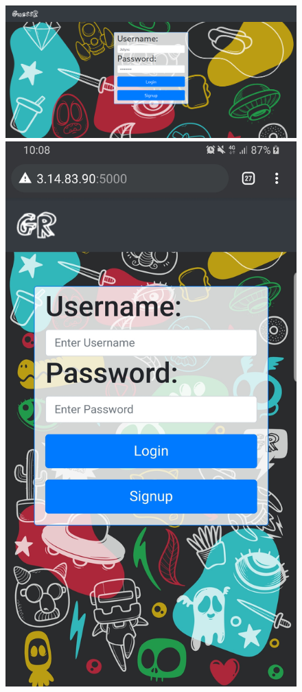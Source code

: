 \begin{figure}[H]
  \centering
  \begin{minipage}[b]{0.75\textwidth}
    \includegraphics[width=\textwidth]{img/screen/Login.png}
  \end{minipage}
  \hfill
  \begin{minipage}[b]{0.2\textwidth}
    \includegraphics[width=\textwidth]{img/screen/M login.jpg}

\end{minipage}
\end{figure}
